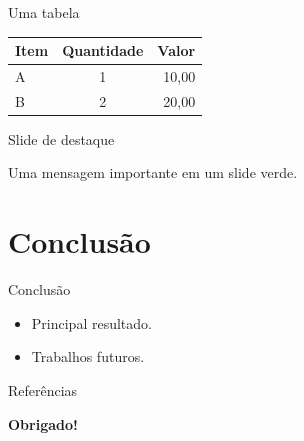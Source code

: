 \documentclass[aspectratio=169]{beamer}
\begin{document}
\begin{frame}{Uma tabela}
  \centering
  \begin{tabular}{lcr}
    \toprule
    Item & Quantidade & Valor \\
    \midrule
    A & 1 & 10,00 \\
    B & 2 & 20,00 \\
    \bottomrule
  \end{tabular}
\end{frame}

\begin{frame}[plain]{Slide de destaque}
  \begin{center}
    \Large Uma mensagem importante em um slide verde.
  \end{center}
\end{frame}

\section{Conclusão}

\begin{frame}{Conclusão}
  \begin{itemize} \itemsep1em
    \item Principal resultado.
    \item Trabalhos futuros.
  \end{itemize}
\end{frame}

\begin{frame}{Referências}
  \printbibliography
\end{frame}

\begin{frame}[plain]
  \begin{center}
    {\Large\bfseries Obrigado!}\par\vspace{1em}
    \insertauthor\par
    {\small\insertemail}\par\vspace{2em}
  \end{center}
\end{frame}
\end{document}
